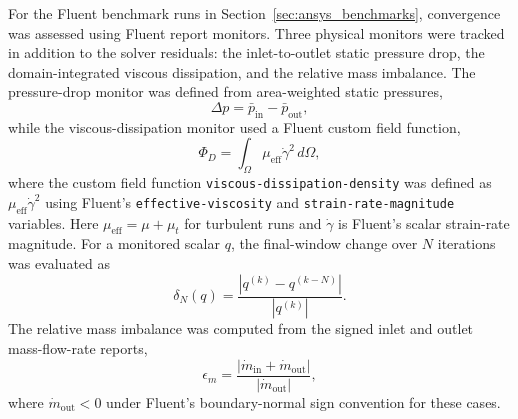 For the Fluent benchmark runs in Section~\ref{sec:ansys_benchmarks}, convergence was assessed using Fluent report monitors. Three physical monitors were tracked in addition to the solver residuals: the inlet-to-outlet static pressure drop, the domain-integrated viscous dissipation, and the relative mass imbalance. The pressure-drop monitor was defined from area-weighted static pressures,
\begin{equation}
	\Delta p = \bar{p}_{\mathrm{in}} - \bar{p}_{\mathrm{out}},
	\label{eq:ch2_fluent_pressure_drop_monitor}
\end{equation}
while the viscous-dissipation monitor used a Fluent custom field function,
\begin{equation}
	\Phi_D = \int_{\Omega} \mu_{\mathrm{eff}}\dot{\gamma}^{2} \, d\Omega ,
	\label{eq:ch2_fluent_viscous_dissipation_monitor}
\end{equation}
where the custom field function \texttt{viscous-dissipation-density} was defined as $\mu_{\mathrm{eff}}\dot{\gamma}^{2}$ using Fluent's \texttt{effective-viscosity} and \texttt{strain-rate-magnitude} variables. Here $\mu_{\mathrm{eff}}=\mu+\mu_t$ for turbulent runs and $\dot{\gamma}$ is Fluent's scalar strain-rate magnitude. For a monitored scalar $q$, the final-window change over $N$ iterations was evaluated as
\begin{equation}
	\delta_N(q) =
	\frac{\left|q^{(k)} - q^{(k-N)}\right|}
	{\left|q^{(k)}\right|} .
	\label{eq:ch2_fluent_monitor_window_change}
\end{equation}
The relative mass imbalance was computed from the signed inlet and outlet mass-flow-rate reports,
\begin{equation}
	\epsilon_m =
	\frac{\left|\dot{m}_{\mathrm{in}} + \dot{m}_{\mathrm{out}}\right|}
	{\left|\dot{m}_{\mathrm{out}}\right|},
	\label{eq:ch2_fluent_mass_imbalance}
\end{equation}
where $\dot{m}_{\mathrm{out}}<0$ under Fluent's boundary-normal sign convention for these cases.

